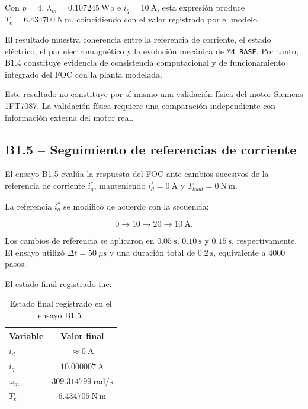 Con \(p=4\), \(\lambda_m=0.107245~\mathrm{Wb}\) e \(i_q=10~\mathrm{A}\), esta expresión produce \(T_e=6.434700~\mathrm{N\,m}\), coincidiendo con el valor registrado por el modelo.

El resultado muestra coherencia entre la referencia de corriente, el estado eléctrico, el par electromagnético y la evolución mecánica de \texttt{M4\_BASE}. Por tanto, B1.4 constituye evidencia de consistencia computacional y de funcionamiento integrado del FOC con la planta modelada.

Este resultado no constituye por sí mismo una validación física del motor Siemens 1FT7087. La validación física requiere una comparación independiente con información externa del motor real.

\subsection{B1.5 -- Seguimiento de referencias de corriente}

El ensayo B1.5 evalúa la respuesta del FOC ante cambios sucesivos de la referencia de corriente \(i_q^*\), manteniendo \(i_d^*=0~\mathrm{A}\) y \(T_{load}=0~\mathrm{N\,m}\).

La referencia \(i_q^*\) se modificó de acuerdo con la secuencia:

\begin{equation}
0
\rightarrow
10
\rightarrow
20
\rightarrow
10~\mathrm{A}.
\end{equation}

Los cambios de referencia se aplicaron en \(0.05~\mathrm{s}\), \(0.10~\mathrm{s}\) y \(0.15~\mathrm{s}\), respectivamente. El ensayo utilizó \(\Delta t=50~\mu\mathrm{s}\) y una duración total de \(0.2~\mathrm{s}\), equivalente a \(4000\) pasos.

El estado final registrado fue:

\begin{table}[H]
\centering
\caption{Estado final registrado en el ensayo B1.5.}
\label{tab:b1_5_resultado}
\begin{tabular}{lc}
\toprule
\textbf{Variable} & \textbf{Valor final} \\
\midrule
\(i_d\) & \(\approx0~\mathrm{A}\) \\
\(i_q\) & \(10.000007~\mathrm{A}\) \\
\(\omega_m\) & \(309.314799~\mathrm{rad/s}\) \\
\(T_e\) & \(6.434705~\mathrm{N\,m}\) \\
\bottomrule
\end{tabular}
\end{table}

